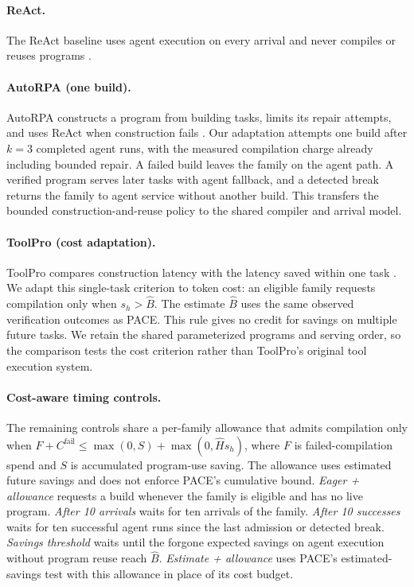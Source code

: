 \paragraph{ReAct.}
The ReAct baseline uses agent execution on every arrival and never compiles or reuses programs \citep{yao2023react}.

\paragraph{AutoRPA (one build).}
AutoRPA constructs a program from building tasks, limits its repair attempts, and uses ReAct when construction fails \citep{chen2026autorpa}.
Our adaptation attempts one build after $k=3$ completed agent runs, with the measured compilation charge already including bounded repair.
A failed build leaves the family on the agent path.
A verified program serves later tasks with agent fallback, and a detected break returns the family to agent service without another build.
This transfers the bounded construction-and-reuse policy to the shared compiler and arrival model.

\paragraph{ToolPro (cost adaptation).}
ToolPro compares construction latency with the latency saved within one task \citep{liu2026toolpro}.
We adapt this single-task criterion to token cost: an eligible family requests compilation only when $s_h>\hat B$.
The estimate $\hat B$ uses the same observed verification outcomes as PACE.
This rule gives no credit for savings on multiple future tasks.
We retain the shared parameterized programs and serving order, so the comparison tests the cost criterion rather than ToolPro's original tool execution system.

\paragraph{Cost-aware timing controls.}
The remaining controls share a per-family allowance that admits compilation only when $F+C^{\mathrm{fail}}\leq\max(0,S)+\max(0,\hat Hs_h)$, where $F$ is failed-compilation spend and $S$ is accumulated program-use saving.
The allowance uses estimated future savings and does not enforce PACE's cumulative bound.
\emph{Eager + allowance} requests a build whenever the family is eligible and has no live program.
\emph{After 10 arrivals} waits for ten arrivals of the family.
\emph{After 10 successes} waits for ten successful agent runs since the last admission or detected break.
\emph{Savings threshold} waits until the forgone expected savings on agent execution without program reuse reach $\hat B$.
\emph{Estimate + allowance} uses PACE's estimated-savings test with this allowance in place of its cost budget.

